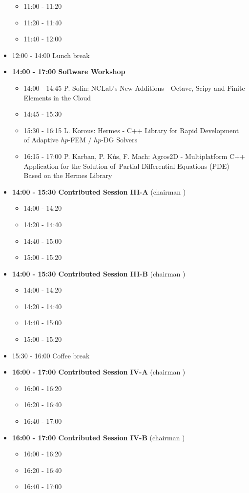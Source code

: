 \documentclass[10pt, A4]{article}
\begin{document}
\begin{itemize}
  \begin{itemize}
    \item 11:00 - 11:20 
    \item 11:20 - 11:40 
    \item 11:40 - 12:00 
  \end{itemize}
  \item 12:00 - 14:00 Lunch break
  \item {\bf 14:00 - 17:00 Software Workshop}
  \begin{itemize}
    \item 14:00 - 14:45 P. Solin: NCLab's New Additions - Octave, Scipy and Finite Elements in the Cloud
    \item 14:45 - 15:30 
    \item 15:30 - 16:15 L. Korous: Hermes - C++ Library for Rapid Development of Adaptive $hp$-FEM / $hp$-DG Solvers
    \item 16:15 - 17:00 P. Karban, P. K\r{u}s, F. Mach: Agros2D - Multiplatform C++ Application for the Solution of~Partial Differential Equations (PDE) Based on the Hermes Library
  \end{itemize}
  \item {\bf 14:00 - 15:30 Contributed Session III-A} (chairman ) 
  \begin{itemize}
    \item 14:00 - 14:20 
    \item 14:20 - 14:40 
    \item 14:40 - 15:00
    \item 15:00 - 15:20  
  \end{itemize}
  \item {\bf 14:00 - 15:30 Contributed Session III-B} (chairman ) 
  \begin{itemize}
    \item 14:00 - 14:20 
    \item 14:20 - 14:40 
    \item 14:40 - 15:00
    \item 15:00 - 15:20  
  \end{itemize}
  \item 15:30 - 16:00 Coffee break
  \item {\bf 16:00 - 17:00 Contributed Session IV-A} (chairman ) 
  \begin{itemize}
    \item 16:00 - 16:20 
    \item 16:20 - 16:40 
    \item 16:40 - 17:00
  \end{itemize}
  \item {\bf 16:00 - 17:00 Contributed Session IV-B} (chairman ) 
  \begin{itemize}
    \item 16:00 - 16:20 
    \item 16:20 - 16:40 
    \item 16:40 - 17:00
  \end{itemize}  
\end{itemize}
\end{document}
